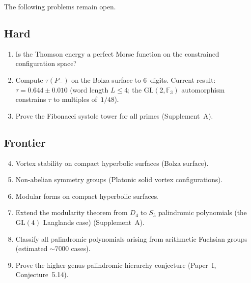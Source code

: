 The following problems remain open.

\subsection*{Hard}
\begin{enumerate}
\item Is the Thomson energy a perfect Morse function on the
  constrained configuration space?
\item Compute $\tau(P_-)$ on the Bolza surface to $6$~digits.
  Current result: $\tau = 0.644 \pm 0.010$ (word length $L \le 4$;
  the $\mathrm{GL}(2,\mathbb{F}_3)$
  automorphism constrains $\tau$ to multiples of~$1/48$).
\item Prove the Fibonacci systole tower for all primes (Supplement~A).
\end{enumerate}

\subsection*{Frontier}
\begin{enumerate}\setcounter{enumi}{3}
\item Vortex stability on compact hyperbolic surfaces (Bolza surface).
\item Non-abelian symmetry groups (Platonic solid vortex configurations).
\item Modular forms on compact hyperbolic surfaces.
\item Extend the modularity theorem from $D_4$ to $S_5$ palindromic polynomials (the $\mathrm{GL}(4)$ Langlands case) (Supplement~A).
\item Classify all palindromic polynomials arising from arithmetic Fuchsian groups (estimated ${\sim}7000$ cases).
\item Prove the higher-genus palindromic hierarchy conjecture (Paper~I, Conjecture~5.14).
\end{enumerate}





